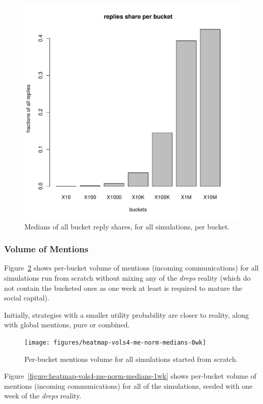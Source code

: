 \documentclass[10pt,oneside]{memoir}
\begin{document}
\begin{figure}
\begin{center}
    \includegraphics{figures/vols4-re-norm-medians-med}
    \caption{Medians of all bucket reply shares, for all simulations, per bucket.}
    \label{figure:vols4-re-norm-medians-med}
\end{center}
\end{figure}
\pagebreak \subsubsection{Volume of Mentions}
\label{volumeofmentions}

Figure~\ref{figure:heatmap-vols4-me-norm-medians-0wk} shows per-bucket volume of mentions (incoming communications) for all simulations  run from scratch without mixing any of the {\itshape dreps} reality (which do not contain the bucketed ones as one week at least is required to mature the social capital).


Initially, strategies with a smaller utility probability are closer to reality, along with global mentions, pure or combined.



\begin{figure}
\begin{center}
    \texttt{[image: figures/heatmap-vols4-me-norm-medians-0wk]}
    \caption{Per-bucket mentions volume for all simulations started from scratch.}
    \label{figure:heatmap-vols4-me-norm-medians-0wk}
\end{center}
\end{figure}
Figure~\ref{figure:heatmap-vols4-me-norm-medians-1wk} shows per-bucket volume of mentions (incoming communications) for all of the simulations, seeded with one week of the {\itshape dreps} reality.
\end{document}
